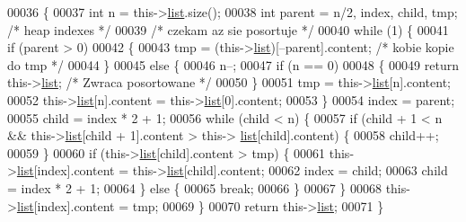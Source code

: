 \begin{DoxyCode}
00036         \{
00037                 \textcolor{keywordtype}{int} n = this->\hyperlink{class_heap_sorter_a6b8ac615ff2de0c2e510ad215d0508d9}{list}.size();
00038             \textcolor{keywordtype}{int} parent = n/2, index, child, tmp; \textcolor{comment}{/* heap indexes */}
00039             \textcolor{comment}{/* czekam az sie posortuje */}
00040             \textcolor{keywordflow}{while} (1) \{
00041                 \textcolor{keywordflow}{if} (parent > 0)
00042                 \{
00043                     tmp = (this->\hyperlink{class_heap_sorter_a6b8ac615ff2de0c2e510ad215d0508d9}{list})[--parent].content;  \textcolor{comment}{/* kobie kopie do tmp */}
00044                 \}
00045                 \textcolor{keywordflow}{else} \{
00046                     n--;
00047                     \textcolor{keywordflow}{if} (n == 0)
00048                     \{
00049                         \textcolor{keywordflow}{return} this->\hyperlink{class_heap_sorter_a6b8ac615ff2de0c2e510ad215d0508d9}{list}; \textcolor{comment}{/* Zwraca posortowane */}
00050                     \}
00051                     tmp = this->\hyperlink{class_heap_sorter_a6b8ac615ff2de0c2e510ad215d0508d9}{list}[n].content;
00052                     this->\hyperlink{class_heap_sorter_a6b8ac615ff2de0c2e510ad215d0508d9}{list}[n].content = this->\hyperlink{class_heap_sorter_a6b8ac615ff2de0c2e510ad215d0508d9}{list}[0].content;
00053                 \}
00054                 index = parent;
00055                 child = index * 2 + 1;
00056                 \textcolor{keywordflow}{while} (child < n) \{
00057                     \textcolor{keywordflow}{if} (child + 1 < n  &&  this->\hyperlink{class_heap_sorter_a6b8ac615ff2de0c2e510ad215d0508d9}{list}[child + 1].content > this->
      \hyperlink{class_heap_sorter_a6b8ac615ff2de0c2e510ad215d0508d9}{list}[child].content) \{
00058                         child++;
00059                     \}
00060                     \textcolor{keywordflow}{if} (this->\hyperlink{class_heap_sorter_a6b8ac615ff2de0c2e510ad215d0508d9}{list}[child].content > tmp) \{
00061                         this->\hyperlink{class_heap_sorter_a6b8ac615ff2de0c2e510ad215d0508d9}{list}[index].content = this->\hyperlink{class_heap_sorter_a6b8ac615ff2de0c2e510ad215d0508d9}{list}[child].content;
00062                         index = child;
00063                         child = index * 2 + 1;
00064                     \} \textcolor{keywordflow}{else} \{
00065                         \textcolor{keywordflow}{break};
00066                     \}
00067                 \}
00068                 this->\hyperlink{class_heap_sorter_a6b8ac615ff2de0c2e510ad215d0508d9}{list}[index].content = tmp;
00069             \}
00070             \textcolor{keywordflow}{return} this->\hyperlink{class_heap_sorter_a6b8ac615ff2de0c2e510ad215d0508d9}{list};
00071         \}
\end{DoxyCode}


